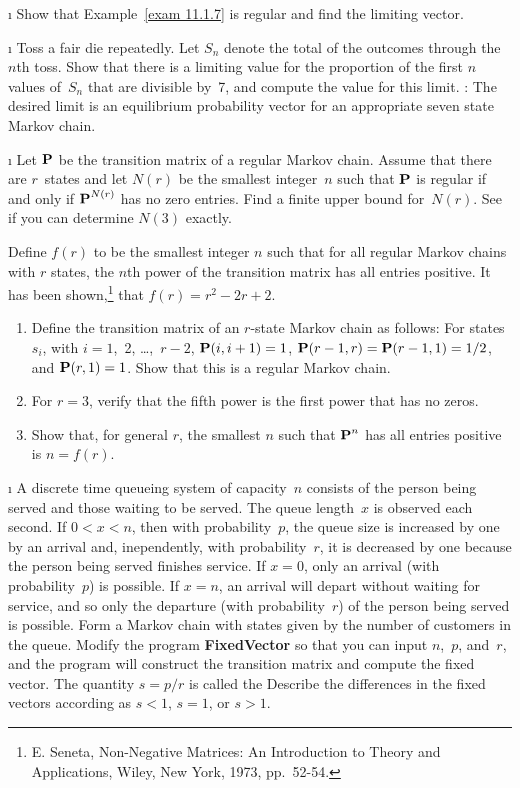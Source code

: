 \begin{LJSItem}
\i\label{exer 11.3.15} Show that Example~\ref{exam 11.1.7} is regular and find
the 
limiting vector.

\i\label{exer 11.3.16} Toss a fair die repeatedly.  Let $S_n$ denote the total
of
the outcomes through the $n$th toss.  Show that there is a limiting value for
the
proportion of the first $n$ values of~$S_n$ that are divisible by~7, and
compute 
the value for this limit.  : The desired limit is an equilibrium
probability vector for an appropriate seven state Markov chain.

\i\label{exer 11.3.17} Let ${\mbox{\bf P}\/}$ be the transition matrix of a regular
Markov 
chain.  Assume that there are $r$~states and let $N(r)$ be the smallest
integer~$n$
such that ${\mbox{\bf P}\/}$ is regular if and only if ${\mbox{\bf P}\/}^{N(r)}$ has no zero
entries. 
Find a finite upper bound for~$N(r)$.  See if you can determine $N(3)$ exactly.

\istar\label{exer 11.3.18} Define $f(r)$ to be the smallest integer $n$ such
that
for all regular Markov chains with $r$ states, the $n$th power of the
transition
matrix has all entries positive.  It has been shown,\footnote{E. Seneta, \emx
{Non-Negative Matrices:  An Introduction to Theory and Applications,}
Wiley, New York, 1973, pp.~52-54.}
that $f(r) = r^2 - 2r + 2$.  
\begin{enumerate}
\item
Define the transition matrix of an $r$-state Markov chain as follows:
For states $s_i$, with $i = 1$,~2, \ldots,~$r - 2$, 
${\mbox{\bf P}\/}(i,i + 1) = 1$, ${\mbox{\bf P}\/}(r - 1,r) = {\mbox{\bf P}\/}(r - 1, 1) = 1/2$, and 
${\mbox{\bf P}\/}(r,1) = 1$. Show that this is a regular Markov chain.

\item For $r = 3$, verify that the fifth power is the first power that has
no zeros.

\item Show that, for general $r$, the smallest $n$ such that ${\mbox{\bf P}\/}^n$ has
all 
entries positive is $n = f(r)$.
\end{enumerate}

\i\label{exer 11.3.19} A discrete time queueing system of capacity~$n$
consists of the person being served and those waiting to be served.  The queue
length~$x$ is observed each second.  If $0 < x < n$, then with probability~$p$,
the queue size is increased by one by an arrival and, inependently, with
probability~$r$, it is decreased by one because the person being served
finishes
service.  If $x = 0$, only an arrival (with probability~$p$) is possible.  If
$x
= n$, an arrival will depart without waiting for service, and so only the
departure (with probability~$r$) of the person being served is possible.  Form
a
Markov chain with states given by the number of customers in the queue.  Modify
the program {\bf  FixedVector} so that you can input $n$,~$p$, and~$r$, and the
program will construct the transition matrix and compute the fixed vector.  The
quantity $s = p/r$ is called the   Describe the
differences in the fixed vectors according as $s < 1$, $s = 1$, or $s > 1$.


\end{LJSItem}
